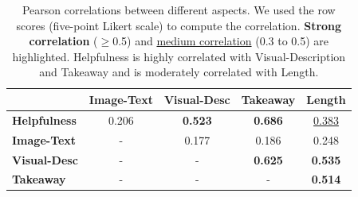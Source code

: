 \begin{table}[t]
    \small
    \center
    \addtolength{\tabcolsep}{-1.5mm}
    
    
    \begin{tabular}{@{}lcccc@{}}
    \toprule
                         & \textbf{Image-Text} & \textbf{Visual-Desc} & \textbf{Takeaway} & \textbf{Length} \\ \midrule
    \textbf{Helpfulness} & 0.206        & \textbf{0.523}           & \textbf{0.686}             & \underline{0.383}           \\
    \textbf{Image-Text}  & -            & 0.177           & 0.186             & 0.248           \\
    \textbf{Visual-Desc} & -            & -               & \textbf{0.625}             & \textbf{0.535}\\
    \textbf{Takeaway}    & -            & -               & -                 & \textbf{0.514} \\
    \bottomrule
    \end{tabular}
    \addtolength{\tabcolsep}{+1.5cm}

    \caption{Pearson correlations between different aspects. We used the row scores (five-point Likert scale) to compute the correlation. 
    \textbf{Strong correlation} ($\geq$0.5) and \underline{medium correlation} (0.3 to 0.5) are highlighted.
    Helpfulness is highly correlated with Visual-Description and Takeaway and is moderately correlated with Length.}
    \label{tab-quality-annotation-correlation}
    
\end{table}
